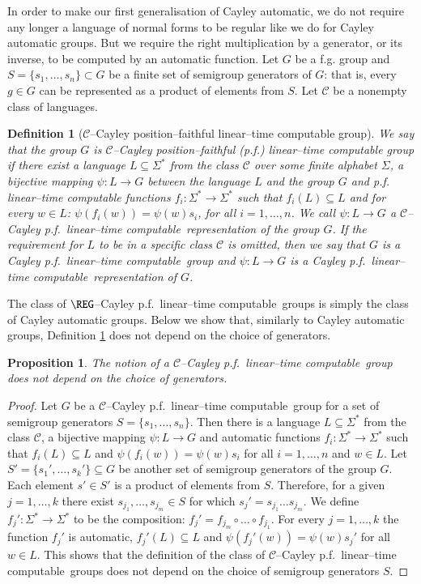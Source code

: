 \documentclass[article,12pt]{elsarticle}
\newtheorem{definition}{Definition}
\newtheorem{proposition}{Proposition}
\newcommand\ClinearC{$\mathcal{C}$--Cayley p.f.~linear--time computable}
\newcommand\linearC{Cayley p.f.~linear--time computable}
\begin{document}
In order to make our first generalisation of Cayley automatic, 
we do not require any longer a 
language of normal forms to be regular like 
we do for Cayley automatic groups. 
But we require the right multiplication
by a generator, or its inverse, to be computed by
an automatic function.     
Let $G$ be a f.g. group and
$S = \{s_1, \dots, s_n\} \subset G$ be  
a finite set of semigroup generators of $G$: that is, every 
$g \in G$ can be represented as a product of 
elements from $S$. 
Let $\mathcal{C}$ be a nonempty class of 
languages. 
\begin{definition}[$\mathcal{C}$--Cayley 
	 position--faithful
	 linear--time 
	 computable group] 
	\label{quasiautdef1}  
	We say that the group $G$  
	is $\mathcal{C}$--Cayley 
	position--faithful (p.f.)
	linear--time 
	computable group
	if 	there exist 
	a language $L \subseteq \Sigma^*$ from the class 
	$\mathcal{C}$ over some 
	finite alphabet $\Sigma$,  
	a bijective mapping 
	$\psi : L \rightarrow G$ between the language 
	$L$ and the group $G$ and p.f. linear--time 
	computable functions
	$f_i: \Sigma^* \rightarrow \Sigma^*$ 
	such that $f_i (L) \subseteq L$ and
	for every $w \in L$:
	$\psi(f_i (w)) = \psi(w)s_i$, 
	for all $i=1,\dots,n$. We call 
	$\psi : L \rightarrow G$ a \ClinearC\ representation of the group $G$.  
	If the requirement for $L$ to be in a specific 
	class $\mathcal{C}$ is omitted, 
	then we say that $G$ is a \linearC\ group and  $\psi : L \rightarrow G$
	is a \linearC\ representation of $G$. 
\end{definition} 
The class of
$\REG$--\linearC\ groups is simply the class of Cayley automatic groups. Below we show that, similarly to Cayley 
automatic groups, Definition \ref{quasiautdef1} 
does not depend on the choice of generators.  
\begin{proposition}
	\label{generator_independence}   
	The notion of a \ClinearC\ group does not depend on the 
	choice of generators.
\end{proposition}
\begin{proof} 
	Let $G$ be a \ClinearC\ 
	group for a set of semigroup generators  
	$S= \{ s_1, \dots, s_n\}$. Then there is 
	a language $L \subseteq \Sigma ^*$ from the 
	class $\mathcal{C}$, a bijective mapping 
	$\psi: L \rightarrow G$ and 
	automatic functions 
	$f_i: \Sigma^* \rightarrow \Sigma^*$ 
	such that $f_i (L) \subseteq L$ and 
	$\psi (f_i (w)) = \psi(w) s_i$ for 
	all $i=1,\dots,n$ and $w \in L$. 
	Let $S' = \{s_1', \dots , s_k'\} 
	\subseteq G$ be another set of 
	semigroup generators of the group $G$.
	Each element $s' \in S'$ is a product 
	of elements from $S$. 
	Therefore, for a given $j = 1, \dots, k$ 
	there exist $s_{j_1}, \dots, s_{j_m} \in S$
	for which $s_j ' = s_{j_1}  \dots s_{j_m}$. 
	We define $f_j ' : \Sigma^* \rightarrow \Sigma^*$ 
	to be the composition: 
	$f_j ' = f_{j_m} \circ \dots \circ f_{j_1}$.
	For every $j = 1,\dots,k$ the function $f_j'$ is  automatic, 
	$f_j ' (L) \subseteq  L$ and 
	$\psi (f_j '(w)) = \psi (w) s_j '$ for all $w \in L$. 
	This shows that the definition of the class 
	of \ClinearC\ groups 
	does not depend on the choice of semigroup 
	generators $S$. 
\end{proof}
\end{document}
